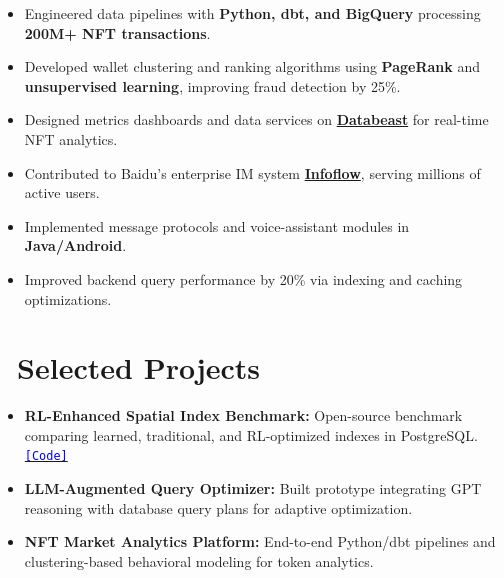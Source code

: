 \documentclass{resume}
\begin{document}
\begin{itemize}
  \item Engineered data pipelines with \textbf{Python, dbt, and BigQuery} processing \textbf{200M+ NFT transactions}.  
  \item Developed wallet clustering and ranking algorithms using \textbf{PageRank} and \textbf{unsupervised learning}, improving fraud detection by 25\%.  
  \item Designed metrics dashboards and data services on \href{https://databeast.xyz/}{\textbf{Databeast}} for real-time NFT analytics.
\end{itemize}

\begin{itemize}
  \item Contributed to Baidu’s enterprise IM system \href{https://infoflow.baidu.com/}{\textbf{Infoflow}}, serving millions of active users.  
  \item Implemented message protocols and voice-assistant modules in \textbf{Java/Android}.  
  \item Improved backend query performance by 20\% via indexing and caching optimizations.
\end{itemize}

\section{\faDatabase\ \textbf{Selected Projects}}
\begin{itemize}
  \item \textbf{RL-Enhanced Spatial Index Benchmark:} Open-source benchmark comparing learned, traditional, and RL-optimized indexes in PostgreSQL.  
        \href{https://github.com/Liuguanli/rl_spatial_benchmark}{\textcolor{blue}{\texttt{[Code]}}}
  \item \textbf{LLM-Augmented Query Optimizer:} Built prototype integrating GPT reasoning with database query plans for adaptive optimization.  
  \item \textbf{NFT Market Analytics Platform:} End-to-end Python/dbt pipelines and clustering-based behavioral modeling for token analytics.  
\end{itemize}
\end{document}
